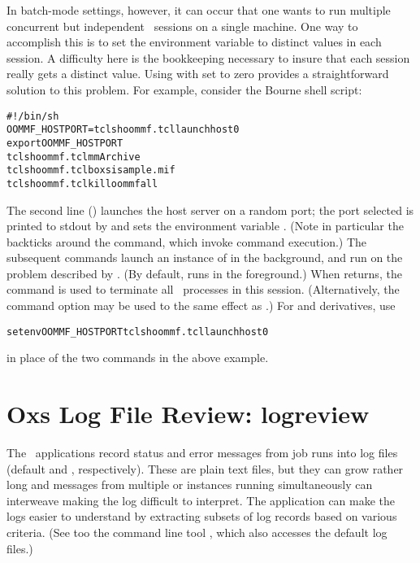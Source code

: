 In batch-mode settings, however, it can occur that one wants to run
multiple concurrent but independent \OOMMF\ sessions on a single
machine.  One way to accomplish this is to set the environment
variable  to distinct values in each session.
A difficulty here is the bookkeeping necessary to insure that each
session really gets a distinct value.  Using  with
 set to zero provides a straightforward solution to this
problem.  For example, consider the Bourne shell script:
\begin{alltt}
   #!/bin/sh
   OOMMF_HOSTPORT=\backtick{}tclsh oommf.tcl launchhost 0\backtick
   export OOMMF_HOSTPORT
   tclsh oommf.tcl mmArchive
   tclsh oommf.tcl boxsi sample.mif
   tclsh oommf.tcl killoommf all
\end{alltt}\html{\\}
The second line () launches the host server
on a random port; the port selected is printed to stdout by
 and sets the environment variable
.  (Note in particular the backticks around the
 command, which invoke command execution.)  The
subsequent commands launch an instance of  in the
background, and run  on the problem described by
.  (By default,  runs in the foreground.)
When  returns, the  command is used to
terminate all \OOMMF\ processes in this session.  (Alternatively, the
 command option  may be used to the same effect
as .)  For  and derivatives, use
\begin{alltt}
   setenv OOMMF_HOSTPORT \backtick{}tclsh oommf.tcl launchhost 0\backtick
\end{alltt}\html{\\}
in place of the two  commands in the above
example.



\section{Oxs Log File Review: logreview\label{sec:logreview}}%
The \OOMMF\ applications
 record status and error
messages from job runs into log files (default
 and , respectively). These
are plain text files, but they can grow rather long and messages from
multiple  or  instances running simultaneously can
interweave making the log difficult to interpret. The 
application can make the logs easier to understand by extracting subsets
of log records based on various criteria. (See too the command line
tool , which also
accesses the default log files.)

